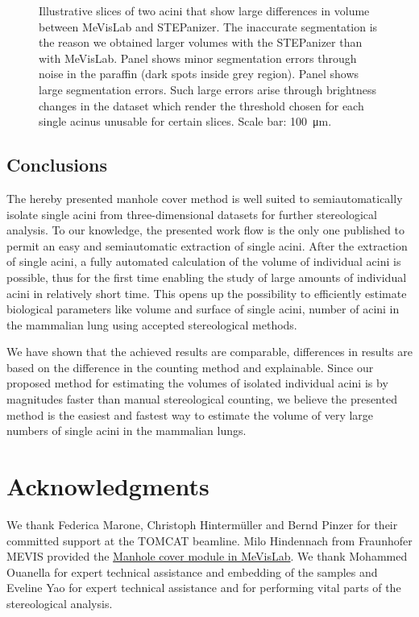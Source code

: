 \documentclass[a4paper,DIVcalc,abstract,english]{scrartcl}
\begin{document}
\begin{figure}[htb]
{		\label{subfig:60e_acinus38}%
	}%
	\hfill%
	\caption{Illustrative slices of two acini that show large differences in volume between MeVisLab and STEPanizer.
		The inaccurate segmentation is the reason we obtained larger volumes with the STEPanizer than with MeVisLab.
		Panel \protect{} shows minor segmentation errors through noise in the paraffin (dark spots inside grey region).
		Panel \protect{} shows large segmentation errors.
		Such large errors arise through brightness changes in the dataset which render the threshold chosen for each single acinus unusable for certain slices.
		Scale bar: \SI{100}{\micro\meter}.}
	\label{fig:MeVisSegmentation}
\end{figure}

\subsection{Conclusions}
The hereby presented manhole cover method is well suited to semiautomatically isolate single acini from three-dimensional datasets for further stereological analysis.
To our knowledge, the presented work flow is the only one published to permit an easy and semiautomatic extraction of single acini.
After the extraction of single acini, a fully automated calculation of the volume of individual acini is possible, thus for the first time enabling the study of large amounts of individual acini in relatively short time.
This opens up the possibility to efficiently estimate biological parameters like volume and surface of single acini, number of acini in the mammalian lung using accepted stereological methods.

We have shown that the achieved results are comparable, differences in results are based on the difference in the counting method and explainable.
Since our proposed method for estimating the volumes of isolated individual acini is by magnitudes faster than manual stereological counting, we believe the presented method is the easiest and fastest way to estimate the volume of very large numbers of single acini in the mammalian lungs.

\clearpage
\section{Acknowledgments}
We thank Federica Marone, Christoph Hintermüller and Bernd Pinzer for their committed support at the TOMCAT beamline.
Milo Hindennach from Fraunhofer MEVIS provided the \href{http://www.mevis-research.de/cgi-bin/discus/board-auth.cgi?lm=1282233250&file=/839/11760.html}{Manhole cover module in MeVisLab}.
We thank Mohammed Ouanella for expert technical assistance and embedding of the samples and Eveline Yao for expert technical assistance and for performing vital parts of the stereological analysis.
\end{document}
